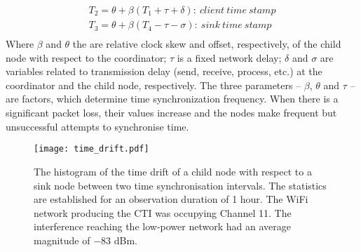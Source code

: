    \begin{equation}
                 \begin{split}
                    T_{2} = \theta+\beta(T_{1} + \tau + \delta ): \ client \ time \ stamp \\
                    T_{3} = \theta+\beta(T_{4} - \tau - \sigma ): \ sink \ time \ stamp  \\                   
                 \end{split}                     
                \label{equ:timestamp_clock_offest}         
                \end{equation}
Where $\beta$ and  $\theta$ the are relative clock skew and offset, respectively, of the child node with respect to the coordinator; $\tau $ is a fixed network delay; $\delta$ and  $\sigma$ are variables related to transmission delay (send, receive, process, etc.) at the coordinator and the child node, respectively. The three parameters -- $\beta$, $\theta$ and $\tau $ -- are factors, which determine time synchronization frequency. When there is a significant packet loss, their values increase and the nodes make frequent but unsuccessful attempts to synchronise time.               

      \begin{figure}[h!]
            	\centering
            	\texttt{[image: time\_drift.pdf]}
            	\caption{The histogram of the time drift of a child node with respect to a sink node between two time synchronisation intervals. The statistics are established for an observation duration of 1 hour. The WiFi network producing the CTI was occupying Channel 11. The interference reaching the low-power network had an average magnitude of $-83$ dBm.} 
            \label{fig: time_drift_interference_1}
            \end{figure}

